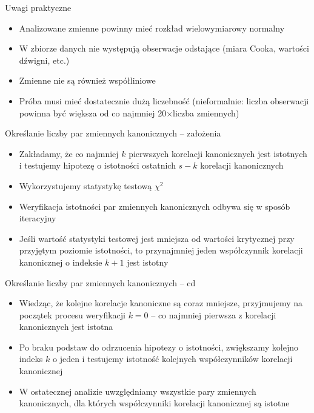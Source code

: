 \documentclass{beamer}
\begin{document}
\begin{frame}{Uwagi praktyczne}
  \begin{itemize}
  \item Analizowane zmienne powinny mieć rozkład wielowymiarowy normalny
  \item W zbiorze danych nie występują obserwacje odstające (miara Cooka, wartości dźwigni, etc.)
  \item Zmienne nie są również współliniowe
  \item Próba musi mieć dostatecznie dużą liczebność (nieformalnie: liczba obserwacji powinna być większa od co najmniej 20$\times$liczba zmiennych)
  \end{itemize}
\end{frame}

\begin{frame}{Określanie liczby par zmiennych kanonicznych -- założenia}
  \begin{itemize}
  \item Zakładamy, że co najmniej $k$ pierwszych korelacji kanonicznych jest istotnych i testujemy hipotezę o istotności ostatnich $s - k$ korelacji kanonicznych
  \item Wykorzystujemy statystykę testową $\chi^2$
  \item Weryfikacja istotności par zmiennych kanonicznych odbywa się w sposób iteracyjny
  \item Jeśli wartość statystyki testowej jest mniejsza od wartości krytycznej przy przyjętym poziomie istotności, to przynajmniej jeden współczynnik korelacji kanonicznej o indeksie $k + 1$ jest istotny
  \end{itemize}
\end{frame}

\begin{frame}{Określanie liczby par zmiennych kanonicznych -- cd}
  \begin{itemize}
  \item Wiedząc, że kolejne korelacje kanoniczne są coraz mniejsze, przyjmujemy na początek procesu weryfikacji $k = 0$ -- co najmniej pierwsza z korelacji kanonicznych jest istotna
  \item Po braku podstaw do odrzucenia hipotezy o istotności, zwiększamy kolejno indeks $k$ o jeden i testujemy istotność kolejnych współczynników korelacji kanonicznej
  \item W ostatecznej analizie uwzględniamy wszystkie pary zmiennych kanonicznych, dla których współczynniki korelacji kanonicznej są istotne
  \end{itemize}
\end{frame}
\end{document}
